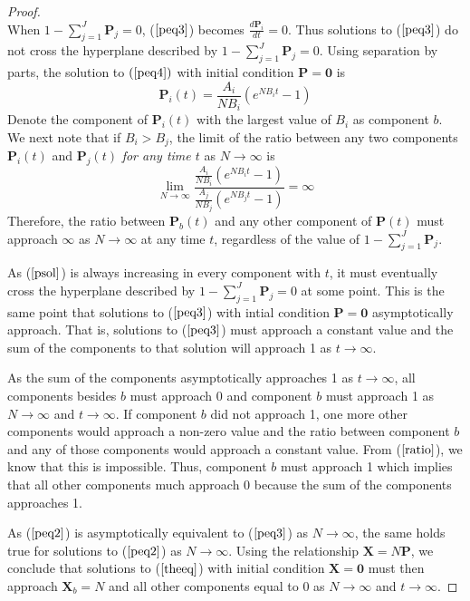 \documentclass{article}
\begin{document}
\begin{proof}
\begin{equation}
    \label{peq4}
  \end{equation}
  When $1 - \sum_{j=1}^J \mathbf{P}_j = 0$, ($\ref{peq3}$) becomes $\frac{d\mathbf{P}_i}{dt} = 0$. Thus solutions to ($\ref{peq3}$) do not cross the hyperplane described by $1 - \sum_{j=1}^J \mathbf{P}_j= 0$. 
  Using separation by parts, the solution to $(\ref{peq4})$ with initial condition $\mathbf{P} = \mathbf{0}$ is
  \begin{equation}
    \mathbf{P}_i(t) = \frac{A_i}{NB_i}\left(e^{NB_it}-1\right)
    \label{psol}
  \end{equation}
  Denote the component of $\mathbf{P}_i(t)$ with the largest value of $B_i$ as component $b$. We next note that if $B_i > B_j$, the limit of the ratio between any two components $\mathbf{P}_i(t)$ and $\mathbf{P}_j(t)$ \textit{for any time $t$} as $N \rightarrow \infty$ is
  \begin{equation}
    \lim_{N \rightarrow \infty} \frac{ \frac{A_i}{NB_i}\left(e^{NB_it}-1\right)
 } { \frac{A_j}{NB_j}\left(e^{NB_jt}-1\right)
} = \infty
    \label{ratio}
  \end{equation}
  Therefore, the ratio between $\mathbf{P}_b(t)$ and any other component of $\mathbf{P}(t)$ must approach $\infty$ as $N \rightarrow \infty$ at any time $t$, regardless of the value of $1 - \sum_{j=1}^J \mathbf{P}_j$. 


As ($\ref{psol}$) is always increasing in every component with $t$, it must eventually cross the hyperplane described by $1 - \sum_{j=1}^J \mathbf{P}_j = 0$ at some point. This is the same point that solutions to ($\ref{peq3}$) with intial condition $\mathbf{P} = \mathbf{0}$ asymptotically approach. That is, solutions to ($\ref{peq3}$) must approach a constant value and the sum of the components to that solution will approach 1 as $t \rightarrow \infty$.

As the sum of the components asymptotically approaches 1 as $t \rightarrow \infty$, all components besides $b$ must approach 0 and component $b$ must approach 1 as $N \rightarrow \infty$ and $t \rightarrow \infty$. If component $b$ did not approach 1, one more other components would approach a non-zero value and the ratio between component $b$ and any of those components would approach a constant value. From ($\ref{ratio}$), we know that this is impossible. Thus, component $b$ must approach 1 which implies that all other components much approach 0 because the sum of the components approaches 1.


As ($\ref{peq2}$) is asymptotically equivalent to ($\ref{peq3}$) as $N \rightarrow \infty$, the same holds true for solutions to ($\ref{peq2}$) as $N \rightarrow \infty$. Using the relationship $\mathbf{X} = N \mathbf{P}$, we conclude that solutions to ($\ref{theeq}$) with initial condition $\mathbf{X} = \mathbf{0}$ must then approach $\mathbf{X}_b = N$ and all other components equal to 0 as $N \rightarrow \infty$ and $t \rightarrow \infty$.

\end{proof}
\end{document}
